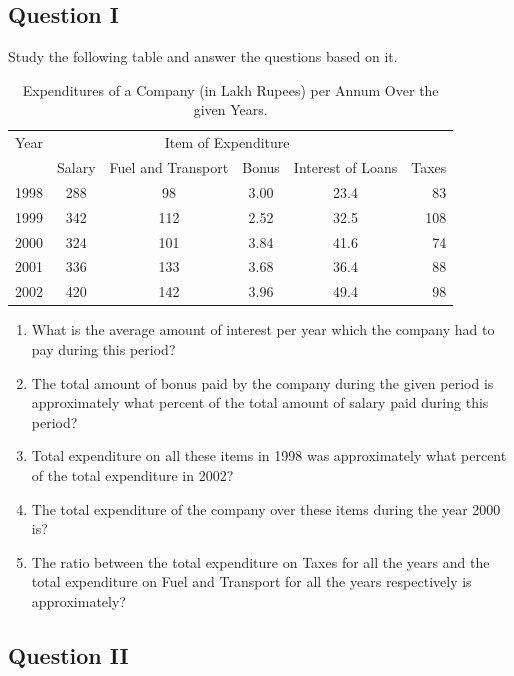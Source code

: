 \documentclass[a4paper]{article}
\begin{document}
\subsection*{Question I}
Study the following table and answer the questions based on it. 
\begin{table}[h]
\begin{tabular}{|l|c|c|c|c|r|}
\hline
Year & \multicolumn{4}{c}{Item of Expenditure} \\
& Salary & Fuel and Transport & Bonus & Interest of Loans & Taxes\\
 \hline
 1998 & 288 & 98 & 3.00 & 23.4 & 83 \\ 
  \hline
 1999 & 342 & 112 & 2.52 & 32.5 & 108 \\ 
  \hline
 2000 & 324 & 101 & 3.84 & 41.6 & 74 \\ 
 \hline
 2001 & 336 & 133 & 3.68 & 36.4 & 88 \\ 
 \hline
 2002 & 420 & 142 & 3.96 & 49.4 & 98 \\ 
 \hline
\end{tabular}
\caption{\label{Question I} Expenditures of a Company (in Lakh Rupees) per Annum Over the given Years.}
\end{table}


\begin{enumerate}
\item What is the average amount of interest per year which the company had to pay during this period?
\item The total amount of bonus paid by the company during the given period is approximately what percent of the total amount of salary paid during this period?
\item Total expenditure on all these items in 1998 was approximately what percent of the total expenditure in 2002?
\item The total expenditure of the company over these items during the year 2000 is?
\item The ratio between the total expenditure on Taxes for all the years and the total expenditure on Fuel and Transport for all the years respectively is approximately?
\end{enumerate}

\subsection*{Question II}
\end{document}
